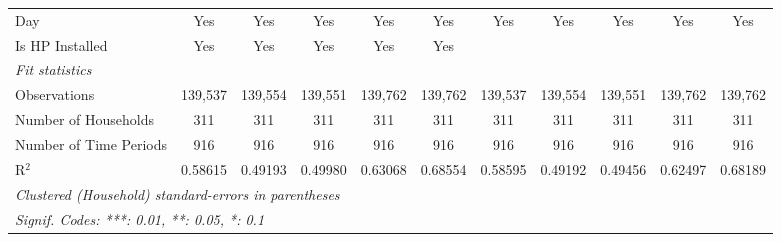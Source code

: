 \begin{table}[htbp]
\begin{tabular}{lcccccccccc}
      Day                                  & Yes            & Yes            & Yes             & Yes             & Yes           & Yes            & Yes            & Yes             & Yes             & Yes\\  
      Is HP Installed                      & Yes            & Yes            & Yes             & Yes             & Yes           &                &                &                 &                 & \\  
      \midrule
      \emph{Fit statistics}\\
      Observations                         & 139,537        & 139,554        & 139,551         & 139,762         & 139,762       & 139,537        & 139,554        & 139,551         & 139,762         & 139,762\\  
      Number of Households       & 311            & 311            & 311             & 311             & 311           & 311            & 311            & 311             & 311             & 311\\  
      Number of Time Periods               & 916            & 916            & 916             & 916             & 916           & 916            & 916            & 916             & 916             & 916\\  
      R$^2$                                & 0.58615        & 0.49193        & 0.49980         & 0.63068         & 0.68554       & 0.58595        & 0.49192        & 0.49456         & 0.62497         & 0.68189\\  
      \midrule \midrule
      \multicolumn{11}{l}{\emph{Clustered (Household) standard-errors in parentheses}}\\
      \multicolumn{11}{l}{\emph{Signif. Codes: ***: 0.01, **: 0.05, *: 0.1}}\\
   \end{tabular}
\end{table}


